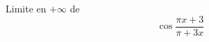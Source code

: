 Limite en $+\infty$ de 
\begin{displaymath}
 \cos \dfrac{\pi x+3}{\pi + 3x}
\end{displaymath}\bigskip
